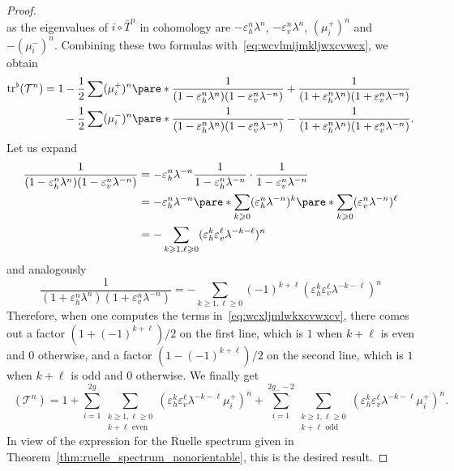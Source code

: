 \documentclass[11pt, a4paper, oneside, final, pagebackref]{amsart}
\newcommand{\boT}{\mathcal{T}}
\DeclareMathOperator{\flattr}{\mathrm{tr}^{\flat}}
\renewcommand{\epsilon}{\varepsilon}
\renewcommand{\geq}{\geqslant}
\theoremstyle{definition}
\numberwithin{equation}{section}
\begin{document}
\begin{proof}
\begin{equation*}
\end{equation*}
as the eigenvalues of $i\circ \bar T^n$ in cohomology are $-\epsilon_h^n
\lambda^n$, $-\epsilon_v^n \lambda^n$, $(\mu_i^+)^n$ and $-(\mu_i^-)^n$.
Combining these two formulas with~\eqref{eq:wcvlmijmkljwxcvwcx}, we obtain
\begin{equation}
\label{eq:wcxljmlwkxcvwxcv}
\begin{split}
  \flattr(\boT^n) = 1 & -\frac{1}{2} \sum (\mu_i^+)^n
    \pare*{\frac{1}{(1-\epsilon_h^n \lambda^n) (1-\epsilon_v^n \lambda^{-n})} + \frac{1}{(1+\epsilon_h^n \lambda^n) (1+\epsilon_v^n \lambda^{-n})}}
  \\ & - \frac{1}{2} \sum (\mu_i^-)^n
      \pare*{\frac{1}{(1-\epsilon_h^n \lambda^n) (1-\epsilon_v^n \lambda^{-n})} - \frac{1}{(1+\epsilon_h^n \lambda^n) (1+\epsilon_v^n \lambda^{-n})}}.
\end{split}
\end{equation}
Let us expand
\begin{align*}
  \frac{1}{(1-\epsilon_h^n \lambda^n) (1-\epsilon_v^n \lambda^{-n})}
  & = -\epsilon_h^n \lambda^{-n} \frac{1}{1-\epsilon_h^n \lambda^{-n}}\cdot \frac{1}{1-\epsilon_v^n \lambda^{-n}}
  \\& = -\epsilon_h^n \lambda^{-n} \pare*{\sum_{k\geq 0} (\epsilon_h^n \lambda^{-n})^k} \pare*{\sum_{k\geq 0} (\epsilon_v^n \lambda^{-n})^\ell}
  \\& = - \sum_{k\geq 1, \ell \geq 0} (\epsilon_h^k \epsilon_v^\ell \lambda^{-k-\ell})^n
\end{align*}
and analogously
\begin{equation*}
  \frac{1}{(1+\epsilon_h^n \lambda^n) (1+\epsilon_v^n \lambda^{-n})}
  = - \sum_{k\geq 1, \ell \geq 0} (-1)^{k+\ell} (\epsilon_h^k \epsilon_v^\ell \lambda^{-k-\ell})^n
\end{equation*}
Therefore, when one computes the terms in~\eqref{eq:wcxljmlwkxcvwxcv}, there
comes out a factor $(1+(-1)^{k+\ell})/2$ on the first line, which is $1$ when
$k+\ell$ is even and $0$ otherwise, and a factor $(1-(-1)^{k+\ell})/2$ on the
second line, which is $1$ when $k+\ell$ is odd and $0$ otherwise. We finally
get
\begin{equation*}
  \flattr(\boT^n) = 1 + \sum_{i=1}^{2g} \sum_{\substack{k \geq 1, \ell \geq 0\\k + \ell \text{ even}}} (\epsilon_h^k \epsilon_v^\ell \lambda^{-k-\ell}\mu_i^+)^n
  + \sum_{i=1}^{2g_--2} \sum_{\substack{k \geq 1, \ell \geq 0\\k + \ell \text{ odd}}} (\epsilon_h^k \epsilon_v^\ell \lambda^{-k-\ell}\mu_i^+)^n.
\end{equation*}
In view of the expression for the Ruelle spectrum given in
Theorem~\ref{thm:ruelle_spectrum_nonorientable}, this is the desired result.
\end{proof}



\end{document}
